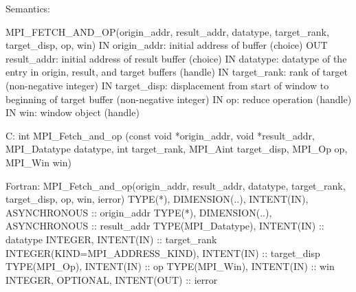 Semantics:

MPI_FETCH_AND_OP(origin_addr, result_addr, datatype, target_rank,
    target_disp, op, win)
IN origin_addr: initial address of buffer (choice)
OUT result_addr: initial address of result buffer (choice)
IN datatype: datatype of the entry in origin, result, and target buffers
(handle)
IN target_rank: rank of target (non-negative integer)
IN target_disp: displacement from start of window to beginning of target
buffer (non-negative integer)
IN op: reduce operation (handle)
IN win: window object (handle)

C:
int MPI_Fetch_and_op
   (const void *origin_addr, void *result_addr,
    MPI_Datatype datatype, int target_rank, MPI_Aint target_disp,
    MPI_Op op, MPI_Win win)

Fortran:
MPI_Fetch_and_op(origin_addr, result_addr, datatype, target_rank,
    target_disp, op, win, ierror)
TYPE(*), DIMENSION(..), INTENT(IN), ASYNCHRONOUS :: origin_addr
TYPE(*), DIMENSION(..), ASYNCHRONOUS :: result_addr
TYPE(MPI_Datatype), INTENT(IN) :: datatype
INTEGER, INTENT(IN) :: target_rank
INTEGER(KIND=MPI_ADDRESS_KIND), INTENT(IN) :: target_disp
TYPE(MPI_Op), INTENT(IN) :: op
TYPE(MPI_Win), INTENT(IN) :: win
INTEGER, OPTIONAL, INTENT(OUT) :: ierror
